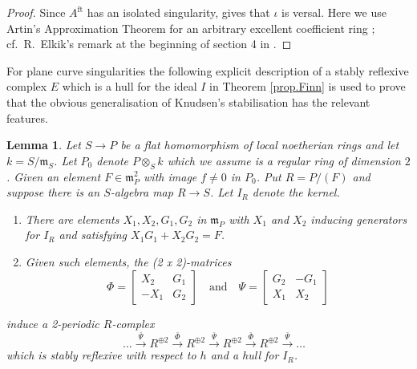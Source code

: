 \documentclass[a4paper,10pt]{amsart}
\theoremstyle{plain}
\newtheorem{lem}[xx]{Lemma}%
\theoremstyle{definition}
\theoremstyle{remark}
\numberwithin{equation}{xx}
\newcommand{\ra}{\rightarrow}
\newcommand{\ot}{{\otimes}}
\newcommand{\fr}[1]{\mathfrak{{#1}}}
\newcommand{\xra}[1]{\xrightarrow{{#1}}}
\begin{document}
\begin{proof}
Since \(A^{\text{ft}}\) has an isolated singularity, \cite[Th{\'e}or{\`e}me 8]{elk:73} gives that \(\iota\) is versal. Here we use Artin's Approximation Theorem for an arbitrary excellent coefficient ring \cite{art:69, pop:86,pop:90}; cf.\  R.\ Elkik's remark at the beginning of section 4 in \cite{elk:73}.
\end{proof}
For plane curve singularities the following explicit description of a stably reflexive complex \(E\) which is a hull for the ideal \(I\) in Theorem \ref{prop.Finn} is used to prove that the obvious generalisation of Knudsen's stabilisation \cite{knu:83a} has the relevant features.
\begin{lem}\label{lem.mf2}
Let \(S\ra P\) be a flat homomorphism of local noetherian rings and let \(k=S/\fr{m}_{S}\)\textup{.} Let \(P_{0}\) denote \(P\ot_{S}k\) which we assume is a regular ring of dimension \(2\)\textup{.}  Given an element \(F\in \fr{m}_{P}^{2}\) with image \(f\neq 0\) in \(P_{0}\)\textup{.} Put \(R=P/(F)\) and suppose there is an \(S\)-algebra map \(R\ra S\)\textup{.} Let \(I_{R}\) denote the kernel\textup{.}
\begin{enumerate}
\item[(i)] There are elements \(X_{1},X_{2},G_{1},G_{2}\) in \(\fr{m}_{P}\) with \(X_{1}\) and \(X_{2}\) inducing generators for \(I_{R}\) and satisfying \(X_{1}G_{1}+X_{2}G_{2}=F\)\textup{.}

\item[(ii)] Given such elements\textup{,} 
the \textup{(2 x 2)}-matrices 
\begin{equation*}
\Phi=
\begin{bmatrix}
X_{2} & G_{1} \\
-X_{1} & G_{2}
\end{bmatrix}
\quad\text{and}\quad
\Psi=
\begin{bmatrix}
G_{2} & -G_{1} \\
X_{1} & X_{2}
\end{bmatrix}
\end{equation*}
\end{enumerate}
induce a 2-periodic \(R\)-complex 
\begin{equation*}
\quad\dots\xra{\bar{\Psi}} R^{\oplus 2}\xra{\bar{\Phi}} R^{\oplus 2}\xra{\bar{\Psi}}R^{\oplus 2}\xra{\bar{\Phi}} R^{\oplus 2}\xra{\bar{\Psi}}\dots
\end{equation*}
which is stably reflexive with respect to \(h\) and a hull for \(I_{R}\)\textup{.}
\end{lem}
\end{document}
